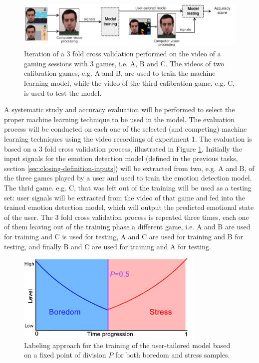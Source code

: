 \begin{figure}[h]
    \centering
    \includegraphics[width=\textwidth]{figures/machine-learning-investigation.png}
    \caption{Iteration of a 3 fold cross validation performed on the video of a gaming sessions with 3 games, i.e. A, B and C. The videos of two calibration games, e.g. A and B, are used to train the machine learning model, while the video of the third calibration game, e.g. C, is used to test the model.}
    \label{fig:machine-learning-investigation}
\end{figure}

A systematic study and accuracy evaluation will be performed to select the proper machine learning technique to be used in the model. The evaluation process will be conducted on each one of the selected (and competing) machine learning techniques using the video recordings of experiment 1. The evaluation is based on a 3 fold cross validation process, illustrated in Figure \ref{fig:machine-learning-investigation}. Initially the input signals for the emotion detection model (defined in the previous tasks, section \ref{sec:closing-definition-inputs}) will be extracted from two, e.g. A and B, of the three games played by a user and used to train the emotion detection model. The thrid game. e.g. C, that was left out of the training will be used as a testing set: user signals will be extracted from the video of that game and fed into the trained emotion detection model, which will output the predicted emotional state of the user. The 3 fold cross validation process is repeated three times, each one of them leaving out of the training phase a different game, i.e. A and B are used for training and C is used for testing, A and C are used for training and B for testing, and finally B and C are used for training and A for testing.

\begin{figure}[h]
    \centering
    \includegraphics[width=0.8\textwidth]{figures/machine-learning-labeling-approach-A.png}
    \caption{Labeling approach for the training of the user-tailored model based on a fixed point of division $P$ for both boredom and stress samples.}
    \label{fig:machine-learning-labeling-approach-A}
\end{figure}

